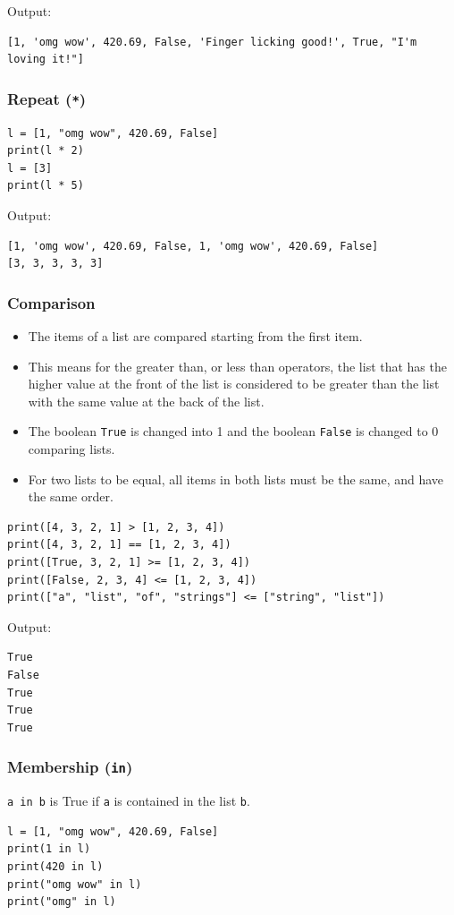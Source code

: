 \documentclass[11pt]{article}
\begin{document}
 \noindent Output:

\begin{verbatim}
[1, 'omg wow', 420.69, False, 'Finger licking good!', True, "I'm loving it!"]
\end{verbatim}

\subsubsection{Repeat (\texttt{*})}
\label{sec:orgae354ff}
\begin{verbatim}
l = [1, "omg wow", 420.69, False]
print(l * 2)
l = [3]
print(l * 5)
\end{verbatim}

 \noindent Output:

\begin{verbatim}
[1, 'omg wow', 420.69, False, 1, 'omg wow', 420.69, False]
[3, 3, 3, 3, 3]
\end{verbatim}

\subsubsection{Comparison}
\label{sec:org9692c1d}
\begin{itemize}
\item The items of a list are compared starting from the first item.
\item This means for the greater than, or less than operators, the list that has the higher value at the front of the list is considered to be greater than the list with the same value at the back of the list.
\item The boolean \texttt{True} is changed into 1 and the boolean \texttt{False} is changed to 0 comparing lists.
\item For two lists to be equal, all items in both lists must be the same, and have the same order.
\end{itemize}
\begin{verbatim}
print([4, 3, 2, 1] > [1, 2, 3, 4])
print([4, 3, 2, 1] == [1, 2, 3, 4])
print([True, 3, 2, 1] >= [1, 2, 3, 4])
print([False, 2, 3, 4] <= [1, 2, 3, 4])
print(["a", "list", "of", "strings"] <= ["string", "list"])
\end{verbatim}

 \noindent Output:

\begin{verbatim}
True
False
True
True
True
\end{verbatim}

\subsubsection{Membership (\texttt{in})}
\label{sec:org2b97793}
\texttt{a in b} is True if \texttt{a} is contained in the list \texttt{b}.
\begin{verbatim}
l = [1, "omg wow", 420.69, False]
print(1 in l)
print(420 in l)
print("omg wow" in l)
print("omg" in l)
\end{verbatim}
\end{document}
